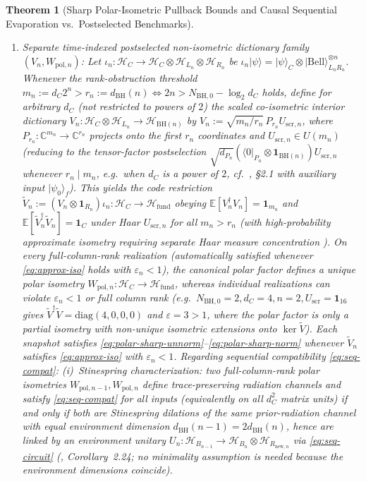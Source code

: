 \documentclass[11pt,a4paper]{article}
\newtheorem{theorem}{Theorem}
\theoremstyle{definition}
\theoremstyle{remark}
\newcommand{\cH}{\mathcal{H}}
\newcommand{\bbC}{\mathbb{C}}
\newcommand{\1}{\mathbf{1}}
\begin{document}
\begin{theorem}[Sharp Polar-Isometric Pullback Bounds and Causal Sequential Evaporation vs.\ Postselected Benchmarks]
\begin{enumerate}
\begin{enumerate}
    \item[(c.2)] \emph{Separate time-indexed postselected non-isometric dictionary family $(V_n,W_{\mathrm{pol},n})$:} Let $\iota_n:\cH_C\to\cH_C\otimes\cH_{L_n}\otimes\cH_{R_n}$ be $\iota_n|\psi\rangle=|\psi\rangle_C\otimes|\mathrm{Bell}\rangle_{L_n R_n}^{\otimes n}$. Whenever the rank-obstruction threshold $m_n:=d_C 2^n > r_n:=d_{\mathrm{BH}}(n) \iff 2n > N_{\mathrm{BH},0}-\log_2 d_C$ holds, define for \emph{arbitrary} $d_C$ (not restricted to powers of $2$) the scaled co-isometric interior dictionary $V_n:\cH_C\otimes\cH_{L_n}\to\cH_{\mathrm{BH}(n)}$ by $V_n:=\sqrt{m_n/r_n}\,P_{r_n} U_{\mathrm{scr},n}$, where $P_{r_n}:\bbC^{m_n}\to\bbC^{r_n}$ projects onto the first $r_n$ coordinates and $U_{\mathrm{scr},n}\in U(m_n)$ (reducing to the tensor-factor postselection $\sqrt{d_{P_n}}(\langle 0|_{P_n}\otimes\1_{\mathrm{BH}(n)})U_{\mathrm{scr},n}$ whenever $r_n\mid m_n$, e.g.\ when $d_C$ is a power of $2$, cf.\ \cite{Akers2024}, \S2.1 with auxiliary input $|\psi_0\rangle_f$). This yields the code restriction $\tilde{V}_n:=(V_n\otimes\1_{R_n})\iota_n:\cH_C\to\cH_{\mathrm{fund}}$ obeying $\mathbb{E}[V_n^\dagger V_n]=\1_{m_n}$ and $\mathbb{E}[\tilde{V}_n^\dagger\tilde{V}_n]=\1_C$ under Haar $U_{\mathrm{scr},n}$ for all $m_n>r_n$ (with high-probability approximate isometry requiring separate Haar measure concentration \cite{Akers2024}). On every full-column-rank realization (automatically satisfied whenever \eqref{eq:approx-iso} holds with $\varepsilon_n<1$), the canonical polar factor defines a unique polar isometry $W_{\mathrm{pol},n}:\cH_C\to\cH_{\mathrm{fund}}$, whereas individual realizations can violate $\varepsilon_n<1$ or full column rank (e.g.\ $N_{\mathrm{BH},0}=2, d_C=4, n=2, U_{\mathrm{scr}}=\1_{16}$ gives $\tilde{V}^\dagger\tilde{V}=\mathrm{diag}(4,0,0,0)$ and $\varepsilon=3>1$, where the polar factor is only a partial isometry with non-unique isometric extensions onto $\ker\tilde{V}$). Each snapshot satisfies \eqref{eq:polar-sharp-unnorm}--\eqref{eq:polar-sharp-norm} whenever $\tilde{V}_n$ satisfies \eqref{eq:approx-iso} with $\varepsilon_n<1$. Regarding sequential compatibility \eqref{eq:seq-compat}:
    \emph{(i)~Stinespring characterization:} two full-column-rank polar isometries $W_{\mathrm{pol},n-1},W_{\mathrm{pol},n}$ define trace-preserving radiation channels and satisfy \eqref{eq:seq-compat} for all inputs (equivalently on all $d_C^2$ matrix units) if and only if both are Stinespring dilations of the same prior-radiation channel with equal environment dimension $d_{\mathrm{BH}}(n-1)=2d_{\mathrm{BH}}(n)$, hence are linked by an environment unitary $U_n:\cH_{B_{n-1}}\to\cH_{B_n}\otimes\cH_{R_{\mathrm{new},n}}$ via \eqref{eq:seq-circuit} (\cite{Watrous2018}, Corollary~2.24; no minimality assumption is needed because the environment dimensions coincide).

\end{enumerate}
\end{enumerate}
\end{theorem}
\end{document}
